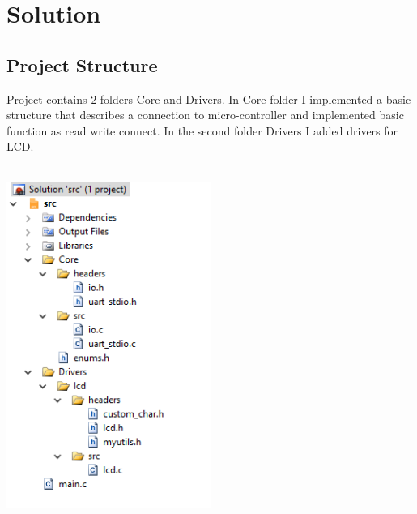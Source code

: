 \section{Solution}

\subsection{Project Structure}
Project contains 2 folders Core and Drivers. In Core folder I implemented a basic structure that describes a connection to micro-controller and implemented basic function as read write connect. In the second folder Drivers I added drivers for LCD.\\\\
\centerline{
	\includegraphics[width=0.5\textwidth]{solution/images/src.png}
}


\newpage
